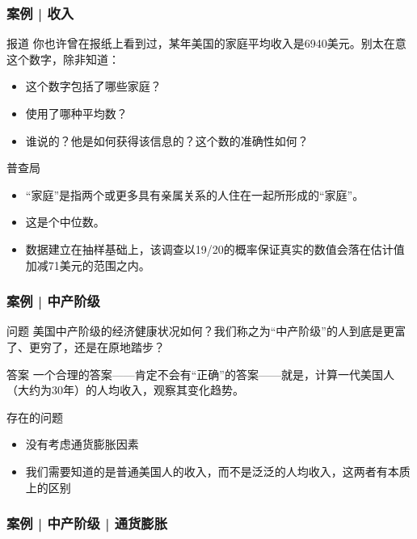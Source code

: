 \begin{frame}
  \frametitle{案例 | 收入}
  \begin{block}{报道}
    你也许曾在报纸上看到过，某年美国的家庭平均收入是6940美元。别太在意这个数字，除非知道：
    \begin{itemize}
      \item 这个数字包括了哪些家庭？
      \item 使用了哪种平均数？
      \item 谁说的？他是如何获得该信息的？这个数的准确性如何？
    \end{itemize}
  \end{block}
  \pause
  \begin{block}{普查局}
    \begin{itemize}
      \item “家庭”是指两个或更多具有亲属关系的人住在一起所形成的“家庭”。
      \item 这是个中位数。
      \item 数据建立在抽样基础上，该调查以19/20的概率保证真实的数值会落在估计值加减71美元的范围之内。
    \end{itemize}
  \end{block}
\end{frame}

\begin{frame}
  \frametitle{案例 | 中产阶级}
  \begin{block}{问题}
    美国中产阶级的经济健康状况如何？我们称之为“中产阶级”的人到底是更富了、更穷了，还是在原地踏步？
  \end{block}
  \pause
  \begin{block}{答案}
    一个合理的答案——肯定不会有“正确”的答案——就是，计算一代美国人（大约为30年）的人均收入，观察其变化趋势。
  \end{block}
  \pause
  \begin{block}{存在的问题}
    \begin{itemize}
      \item 没有考虑通货膨胀因素
      \item 我们需要知道的是普通美国人的收入，而不是泛泛的人均收入，这两者有本质上的区别
    \end{itemize}
  \end{block}
\end{frame}

\begin{frame}
  \frametitle{案例 | 中产阶级 | 通货膨胀}
  \begin{figure}
    \centering
    \\
  \end{figure}
\end{frame}

